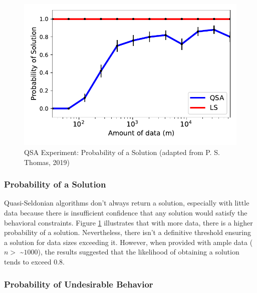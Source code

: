 \documentclass[12pt, twoside]{amherstthesis}
\begin{document}
\begin{figure}

{\centering \includegraphics{Dasha-Asienga_StatThesis_files/figure-latex/fig5-3} 

}

\caption{QSA Experiment: Probability of a Solution (adapted from P. S. Thomas, 2019)}\label{fig:fig5}
\end{figure}
\hypertarget{probability-of-a-solution}{%
\subsubsection{Probability of a Solution}\label{probability-of-a-solution}}

Quasi-Seldonian algorithms don't always return a solution, especially with little data because there is insufficient confidence that any solution would satisfy the behavioral constraints. Figure \ref{fig:fig5} illustrates that with more data, there is a higher probability of a solution. Nevertheless, there isn't a definitive threshold ensuring a solution for data sizes exceeding it. However, when provided with ample data (\(n >\) \textasciitilde{}\(1000\)), the results suggested that the likelihood of obtaining a solution tends to exceed 0.8.

\hypertarget{probability-of-undesirable-behavior}{%
\subsubsection{Probability of Undesirable Behavior}\label{probability-of-undesirable-behavior}}
\end{document}
